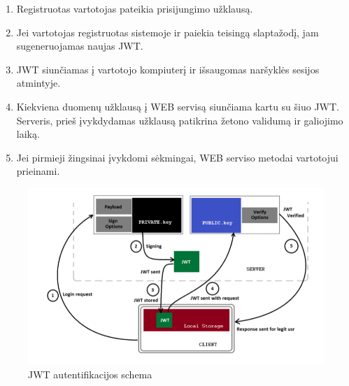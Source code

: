\documentclass{VUMIFInfBakalaurinis}
\begin{document}
\begin{enumerate}
\item Registruotas vartotojas pateikia prisijungimo užklausą.
\item Jei vartotojas registruotas sistemoje ir paiekia teisingą slaptažodį, jam sugeneruojamas naujas JWT. 
\item JWT siunčiamas į vartotojo kompiuterį ir išsaugomas naršyklės sesijos atmintyje.
\item Kiekviena duomenų užklausą į WEB servisą siunčiama kartu su šiuo JWT. Serveris, prieš įvykdydamas užklausą patikrina žetono validumą ir galiojimo laiką.
\item Jei pirmieji žingsinai įvykdomi sėkmingai, WEB serviso metodai vartotojui prieinami.
\end{enumerate}

\begin{figure}[H]
    \centering
    \includegraphics[scale=0.5]{img/jwt-flow}
    \caption{JWT autentifikacijos schema}   %
    \label{img:mlp}
\end{figure}

\end{document}
